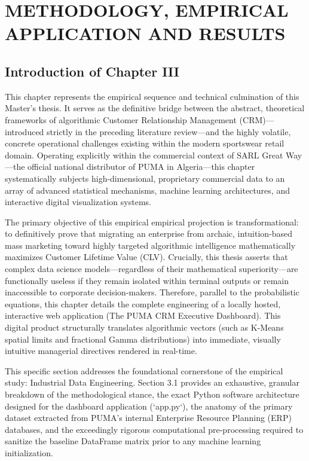 \documentclass[12pt,a4paper]{report}
\begin{document}
\setcounter{chapter}{2} %
\chapter{METHODOLOGY, EMPIRICAL APPLICATION AND RESULTS}

\section*{Introduction of Chapter III}
This chapter represents the empirical sequence and technical culmination of this Master's thesis. It serves as the definitive bridge between the abstract, theoretical frameworks of algorithmic Customer Relationship Management (CRM)—introduced strictly in the preceding literature review—and the highly volatile, concrete operational challenges existing within the modern sportswear retail domain. Operating explicitly within the commercial context of SARL Great Way—the official national distributor of PUMA in Algeria—this chapter systematically subjects high-dimensional, proprietary commercial data to an array of advanced statistical mechanisms, machine learning architectures, and interactive digital visualization systems.

The primary objective of this empirical empirical projection is transformational: to definitively prove that migrating an enterprise from archaic, intuition-based mass marketing toward highly targeted algorithmic intelligence mathematically maximizes Customer Lifetime Value (CLV). Crucially, this thesis asserts that complex data science models—regardless of their mathematical superiority—are functionally useless if they remain isolated within terminal outputs or remain inaccessible to corporate decision-makers. Therefore, parallel to the probabilistic equations, this chapter details the complete engineering of a locally hosted, interactive web application (The PUMA CRM Executive Dashboard). This digital product structurally translates algorithmic vectors (such as K-Means spatial limits and fractional Gamma distributions) into immediate, visually intuitive managerial directives rendered in real-time.

This specific section addresses the foundational cornerstone of the empirical study: Industrial Data Engineering. Section 3.1 provides an exhaustive, granular breakdown of the methodological stance, the exact Python software architecture designed for the dashboard application (`app.py`), the anatomy of the primary dataset extracted from PUMA's internal Enterprise Resource Planning (ERP) databases, and the exceedingly rigorous computational pre-processing required to sanitize the baseline DataFrame matrix prior to any machine learning initialization.
\end{document}
